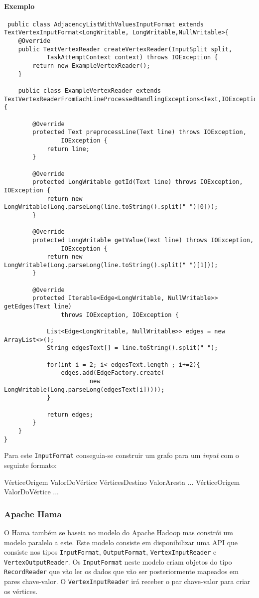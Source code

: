 \paragraph{Exemplo}
\begin{verbatim}
 public class AdjacencyListWithValuesInputFormat extends 
TextVertexInputFormat<LongWritable, LongWritable,NullWritable>{
	@Override
	public TextVertexReader createVertexReader(InputSplit split,
			TaskAttemptContext context) throws IOException { 
		return new ExampleVertexReader();
	}
	
	public class ExampleVertexReader extends 
TextVertexReaderFromEachLineProcessedHandlingExceptions<Text,IOException>{

		@Override
		protected Text preprocessLine(Text line) throws IOException,
				IOException {
			return line;
		}

		@Override
		protected LongWritable getId(Text line) throws IOException, 
IOException {
			return new 
LongWritable(Long.parseLong(line.toString().split(" ")[0]));
		}

		@Override
		protected LongWritable getValue(Text line) throws IOException,
				IOException {
			return new 
LongWritable(Long.parseLong(line.toString().split(" ")[1]));
		}

		@Override
		protected Iterable<Edge<LongWritable, NullWritable>> 
getEdges(Text line)
				throws IOException, IOException {
			
			List<Edge<LongWritable, NullWritable>> edges = new 
ArrayList<>();
			String edgesText[] = line.toString().split(" ");
			
			for(int i = 2; i< edgesText.length ; i+=2){
				edges.add(EdgeFactory.create(
						new 
LongWritable(Long.parseLong(edgesText[i]))));
			}
			
			return edges;
		}
	}
}
\end{verbatim}

Para este \texttt{InputFormat} conseguia-se construir um grafo para um 
\textit{input} com o seguinte formato:

VérticeOrigem ValorDoVértice VérticesDestino ValorAresta ...
VérticeOrigem ValorDoVértice ...

\subsubsection*{Apache Hama}

O Hama também se baseia no modelo do Apache Hadoop mas constrói um modelo paralelo a este.
Este modelo consiste em disponibilizar uma API que consiste nos tipos \texttt{InputFormat}, \texttt{OutputFormat}, \texttt{VertexInputReader} e \texttt{VertexOutputReader}. Os \texttt{InputFormat} neste modelo criam objetos do tipo \texttt{RecordReader} 
que vão ler os dados que vão ser posteriormente mapeados em pares chave-valor. O \texttt{VertexInputReader} irá receber o par chave-valor para criar os
vértices.

